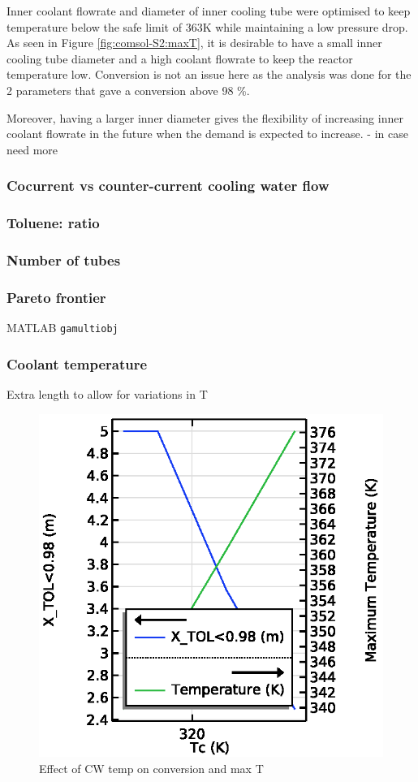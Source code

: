 Inner coolant flowrate and diameter of inner cooling tube were optimised to keep temperature below the safe limit of 363K while maintaining a low pressure drop. As seen in Figure \ref{fig:comsol-S2:maxT}, it is desirable to have a small inner cooling tube diameter and a high coolant flowrate to keep the reactor temperature low. Conversion is not an issue here as the analysis was done for the 2 parameters that gave a conversion above 98 \%.

Moreover, having a larger inner diameter gives the flexibility of increasing inner coolant flowrate in the future when the demand is expected to increase. 
- in case need more


\subsubsection{Cocurrent vs counter-current cooling water flow}

\subsubsection{Toluene:  ratio}

\subsubsection{Number of tubes}

\subsubsection{Pareto frontier}
MATLAB \texttt{gamultiobj}

\subsubsection{Coolant temperature}
Extra length to allow for variations in T

\begin{figure}[h]
    \centering
    \includegraphics[width=0.49\linewidth]{figures/S4-CW-X-T.eps}
    \caption{Effect of CW temp on conversion and max T}
    \label{fig:comsol-S4-CW-X-T}
\end{figure}
